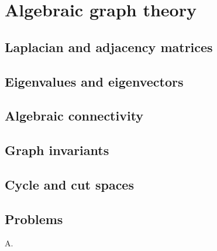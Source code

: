 
\chapter{Algebraic graph theory}
\label{chap:algebraic_graph_theory}



\section{Laplacian and adjacency matrices}



\section{Eigenvalues and eigenvectors}



\section{Algebraic connectivity}



\section{Graph invariants}



\section{Cycle and cut spaces}



\section{Problems}

\begin{problem}
\item A.
\end{problem}
